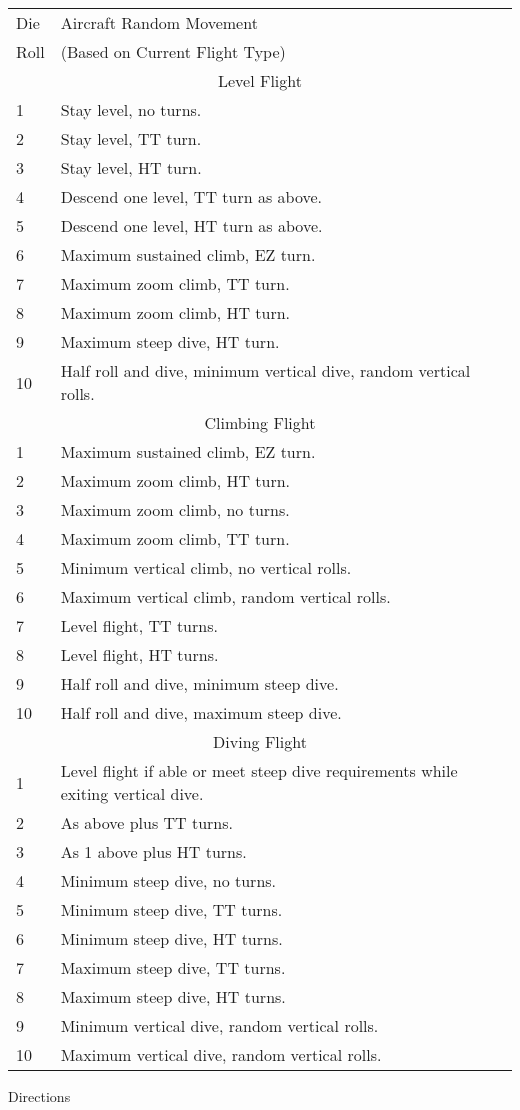 \begin{onecolumntable}
\small
\begin{tabularx}{\linewidth}{lX}
\toprule
Die&Aircraft Random Movement\\
Roll&(Based on Current Flight Type)\\
\midrule
\multicolumn{2}{c}{Level Flight}\\
\midrule
1   &Stay level, no turns.\\
2   &Stay level, TT turn.\\
3   &Stay level, HT turn.\\
4   &Descend one level, TT turn as above.\\
5   &Descend one level, HT turn as above.\\
6   &Maximum sustained climb, EZ turn.\\
7   &Maximum zoom climb, TT turn.\\
8   &Maximum zoom climb, HT turn.\\
9   &Maximum steep dive, HT turn.\\
10  &Half roll and dive, minimum vertical dive, random vertical rolls.\\
\midrule
\multicolumn{2}{c}{Climbing Flight}\\
\midrule
1   &Maximum sustained climb, EZ turn.\\
2   &Maximum zoom climb, HT turn.\\
3   &Maximum zoom climb, no turns.\\
4   &Maximum zoom climb, TT turn.\\
5   &Minimum vertical climb, no vertical rolls.\\
6   &Maximum vertical climb, random vertical rolls.\\
7   &Level flight, TT turns.\\
8   &Level flight, HT turns.\\
9   &Half roll and dive, minimum steep dive.\\
10  &Half roll and dive, maximum steep dive.\\
\midrule
\multicolumn{2}{c}{Diving Flight}\\
\midrule
1   &Level flight if able or meet steep dive requirements while exiting vertical dive.\\
2   &As above plus TT turns.\\
3   &As 1 above plus HT turns.\\
4   &Minimum steep dive, no turns.\\
5   &Minimum steep dive, TT turns.\\
6   &Minimum steep dive, HT turns.\\
7   &Maximum steep dive, TT turns.\\
8   &Maximum steep dive, HT turns.\\
9   &Minimum vertical dive, random vertical rolls.\\
10  &Maximum vertical dive, random vertical rolls.\\
\bottomrule
\end{tabularx}
\begin{tablenote}{\linewidth}
{\centering Directions\par\smallskip}


\end{tablenote}
\end{onecolumntable}
